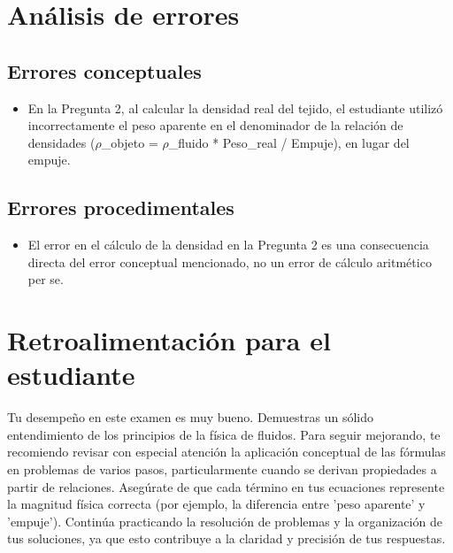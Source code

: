 \documentclass[11pt,a4paper]{article}
\begin{document}
\section*{Análisis de errores}

\subsection*{Errores conceptuales}
\begin{itemize}[leftmargin=1.5em, itemsep=2pt]
  \item En la Pregunta 2, al calcular la densidad real del tejido, el estudiante utilizó incorrectamente el peso aparente en el denominador de la relación de densidades ($\rho$\_objeto = $\rho$\_fluido * Peso\_real / Empuje), en lugar del empuje.
\end{itemize}

\subsection*{Errores procedimentales}
\begin{itemize}[leftmargin=1.5em, itemsep=2pt]
  \item El error en el cálculo de la densidad en la Pregunta 2 es una consecuencia directa del error conceptual mencionado, no un error de cálculo aritmético per se.
\end{itemize}

\section*{Retroalimentación para el estudiante}
\begin{tcolorbox}[cajaRecomendacion, title={Dirigido a: daniela rivero 31435612}]
Tu desempeño en este examen es muy bueno. Demuestras un sólido entendimiento de los principios de la física de fluidos. Para seguir mejorando, te recomiendo revisar con especial atención la aplicación conceptual de las fórmulas en problemas de varios pasos, particularmente cuando se derivan propiedades a partir de relaciones. Asegúrate de que cada término en tus ecuaciones represente la magnitud física correcta (por ejemplo, la diferencia entre 'peso aparente' y 'empuje'). Continúa practicando la resolución de problemas y la organización de tus soluciones, ya que esto contribuye a la claridad y precisión de tus respuestas.
\end{tcolorbox}
\end{document}
